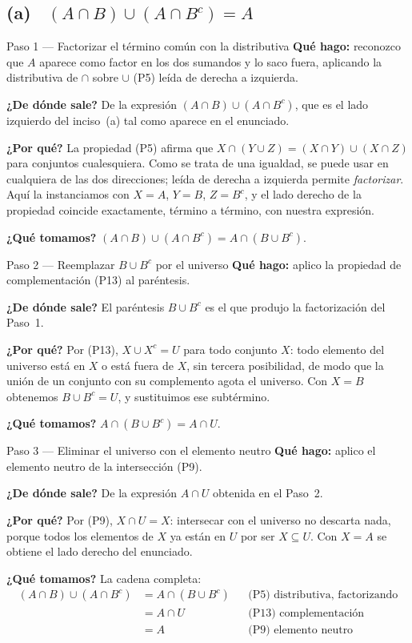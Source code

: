 \documentclass[11pt]{article}
\begin{document}
\subsection*{(a) \ $(A\cap B)\cup(A\cap B^{c})=A$}

\begin{paso}{Paso 1 --- Factorizar el término común con la distributiva}
\textbf{Qué hago:} reconozco que $A$ aparece como factor en los dos sumandos y lo saco fuera,
aplicando la distributiva de $\cap$ sobre $\cup$ (P5) leída de derecha a izquierda.

\textbf{¿De dónde sale?} De la expresión $(A\cap B)\cup(A\cap B^{c})$, que es el lado izquierdo
del inciso~(a) tal como aparece en el enunciado.

\textbf{¿Por qué?} La propiedad (P5) afirma que $X\cap(Y\cup Z)=(X\cap Y)\cup(X\cap Z)$ para
conjuntos cualesquiera. Como se trata de una igualdad, se puede usar en cualquiera de las dos
direcciones; leída de derecha a izquierda permite \emph{factorizar}. Aquí la instanciamos con
$X=A$, $Y=B$, $Z=B^{c}$, y el lado derecho de la propiedad coincide exactamente, término a
término, con nuestra expresión.

\textbf{¿Qué tomamos?} $(A\cap B)\cup(A\cap B^{c})=A\cap(B\cup B^{c})$.
\end{paso}

\begin{paso}{Paso 2 --- Reemplazar $B\cup B^{c}$ por el universo}
\textbf{Qué hago:} aplico la propiedad de complementación (P13) al paréntesis.

\textbf{¿De dónde sale?} El paréntesis $B\cup B^{c}$ es el que produjo la factorización del
Paso~1.

\textbf{¿Por qué?} Por (P13), $X\cup X^{c}=U$ para todo conjunto $X$: todo elemento del universo
está en $X$ o está fuera de $X$, sin tercera posibilidad, de modo que la unión de un conjunto con
su complemento agota el universo. Con $X=B$ obtenemos $B\cup B^{c}=U$, y sustituimos ese
subtérmino.

\textbf{¿Qué tomamos?} $A\cap(B\cup B^{c})=A\cap U$.
\end{paso}

\begin{paso}{Paso 3 --- Eliminar el universo con el elemento neutro}
\textbf{Qué hago:} aplico el elemento neutro de la intersección (P9).

\textbf{¿De dónde sale?} De la expresión $A\cap U$ obtenida en el Paso~2.

\textbf{¿Por qué?} Por (P9), $X\cap U=X$: intersecar con el universo no descarta nada, porque
todos los elementos de $X$ ya están en $U$ por ser $X\subseteq U$. Con $X=A$ se obtiene el lado
derecho del enunciado.

\textbf{¿Qué tomamos?} La cadena completa:
\begin{align*}
(A\cap B)\cup(A\cap B^{c})
&=A\cap(B\cup B^{c}) && \text{(P5) distributiva, factorizando}\\
&=A\cap U && \text{(P13) complementación}\\
&=A && \text{(P9) elemento neutro}
\end{align*}
\end{paso}
\end{document}
